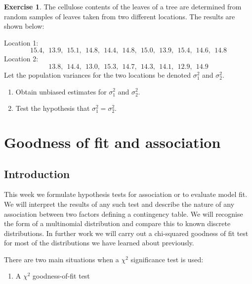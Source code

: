 \documentclass[
]{book}
\providecommand{\tightlist}{%
  \setlength{\itemsep}{0pt}\setlength{\parskip}{0pt}}
\theoremstyle{definition}
\theoremstyle{definition}
\theoremstyle{definition}
\newtheorem{exercise}{Exercise}[chapter]
\theoremstyle{definition}
\theoremstyle{remark}
\begin{document}
\begin{exercise}

The cellulose contents of the leaves of a tree are determined from random samples of leaves taken from two different locations. The results are shown below:

Location 1:
\[15.4, \ \ 13.9, \ \ 15.1, \ \ 14.8, \ \ 14.4, \ \ 14.8, \ \ 15.0, \ \  13.9, \ \ 15.4, \ \ 14.6, \ \ 14.8 \]
Location 2:
\[13.8, \ \ 14.4, \ \ 13.0, \ \ 15.3, \ \ 14.7, \ \ 14.3, \ \ 14.1, \ \ 12.9, \ \ 14.9 \]
Let the population variances for the two locations be denoted \(\sigma_1^2\) and \(\sigma_2^2\).

\begin{enumerate}
\def\labelenumi{\alph{enumi})}
\item
  Obtain unbiased estimates for \(\sigma_1^2\) and \(\sigma_2^2\).
\item
  Test the hypothesis that \(\sigma_1^2=\sigma_2^2\).
\end{enumerate}

\end{exercise}

\hypertarget{goodness-of-fit-and-association}{%
\chapter{Goodness of fit and association}\label{goodness-of-fit-and-association}}

\hypertarget{introduction}{%
\section{Introduction}\label{introduction}}

This week we formulate hypothesis tests for association or to evaluate model fit. We will interpret the results of any such test and describe the nature of any association between two factors defining a contingency table. We will recognise the form of a multinomial distribution and compare this to known discrete distributions. In further work we will carry out a chi-squared goodness of fit test for most of the distributions we have learned about previously.

There are two main situations when a \(\chi^2\) significance test is used:

\begin{enumerate}
\def\labelenumi{\arabic{enumi}.}
\tightlist
\item
  A \(\chi^2\) goodness-of-fit test
\end{enumerate}
\end{document}

